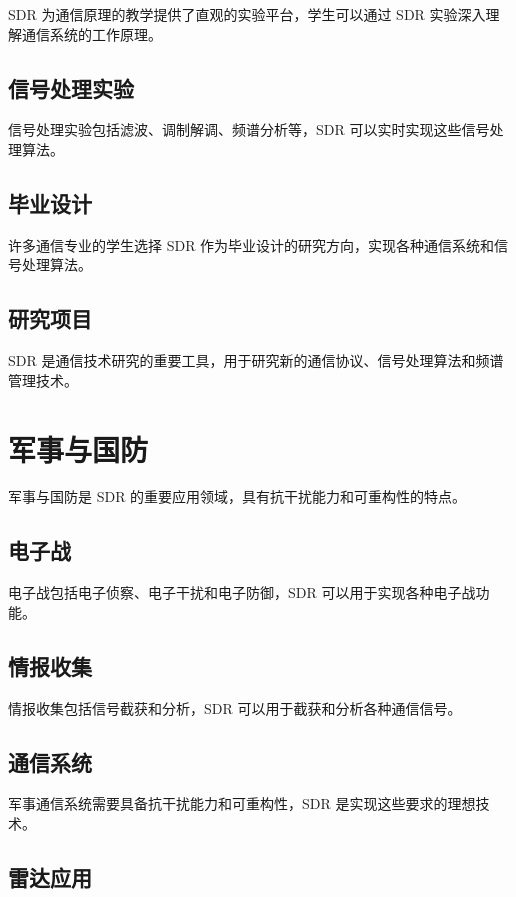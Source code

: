 \documentclass[UTF8]{ctexbook}
\begin{document}
SDR 为通信原理的教学提供了直观的实验平台，学生可以通过 SDR 实验深入理解通信系统的工作原理。

\subsection{信号处理实验}

信号处理实验包括滤波、调制解调、频谱分析等，SDR 可以实时实现这些信号处理算法。

\subsection{毕业设计}

许多通信专业的学生选择 SDR 作为毕业设计的研究方向，实现各种通信系统和信号处理算法。

\subsection{研究项目}

SDR 是通信技术研究的重要工具，用于研究新的通信协议、信号处理算法和频谱管理技术。

\section{军事与国防}

军事与国防是 SDR 的重要应用领域，具有抗干扰能力和可重构性的特点。

\subsection{电子战}

电子战包括电子侦察、电子干扰和电子防御，SDR 可以用于实现各种电子战功能。

\subsection{情报收集}

情报收集包括信号截获和分析，SDR 可以用于截获和分析各种通信信号。

\subsection{通信系统}

军事通信系统需要具备抗干扰能力和可重构性，SDR 是实现这些要求的理想技术。

\subsection{雷达应用}
\end{document}
